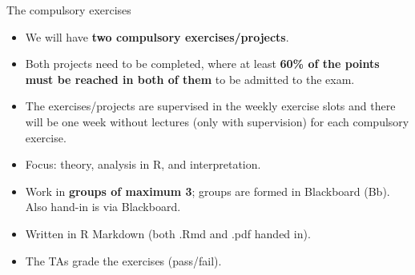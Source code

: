 \documentclass[
  10pt,
  ignorenonframetext,
]{beamer}
\providecommand{\tightlist}{%
  \setlength{\itemsep}{0pt}\setlength{\parskip}{0pt}}
\begin{document}
\begin{frame}
\begin{block}{The compulsory exercises}
\protect\hypertarget{the-compulsory-exercises}{}
\vspace{4mm}

\begin{itemize}
\tightlist
\item
  We will have \textbf{two compulsory exercises/projects}.
\end{itemize}

\vspace{2mm}

\begin{itemize}
\tightlist
\item
  Both projects need to be completed, where at least \textbf{60\% of the
  points must be reached in both of them} to be admitted to the exam.
\end{itemize}

\vspace{2mm}

\begin{itemize}
\tightlist
\item
  The exercises/projects are supervised in the weekly exercise slots and
  there will be one week without lectures (only with supervision) for
  each compulsory exercise.
\end{itemize}

\vspace{2mm}

\begin{itemize}
\tightlist
\item
  Focus: theory, analysis in R, and interpretation.
\end{itemize}

\vspace{2mm}

\begin{itemize}
\tightlist
\item
  Work in \textbf{groups of maximum 3}; groups are formed in Blackboard
  (Bb). Also hand-in is via Blackboard.
\end{itemize}

\vspace{2mm}

\begin{itemize}
\tightlist
\item
  Written in R Markdown (both .Rmd and .pdf handed in).
\end{itemize}

\vspace{2mm}

\begin{itemize}
\tightlist
\item
  The TAs grade the exercises (pass/fail).
\end{itemize}
\end{block}
\end{frame}
\end{document}
